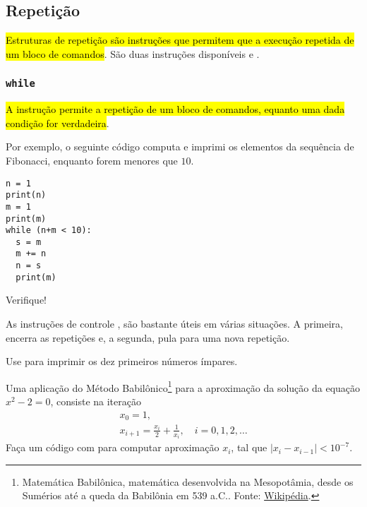 \documentclass[12pt]{article}
\begin{document}
\subsection{Repetição}

\hl{Estruturas de repetição são instruções que permitem que a execução repetida de um bloco de comandos}. São duas instruções disponíveis {\PYTHONwhile} e {\PYTHONfor}.

\subsubsection{\texttt{while}}

\hl{A instrução {\PYTHONwhile} permite a repetição de um bloco de comandos, equanto uma dada condição for verdadeira}. 

Por exemplo, o seguinte código computa e imprimi os elementos da sequência de Fibonacci{\fibonacci}, enquanto forem menores que $10$.

\begin{lstlisting}
n = 1
print(n)
m = 1
print(m)
while (n+m < 10):
  s = m
  m += n
  n = s
  print(m)
\end{lstlisting}

Verifique!

\begin{obs}
  As instruções de controle {\PYTHONbreak}, {\PYTHONcontinue} são bastante úteis em várias situações. A primeira, encerra as repetições e, a segunda, pula para uma nova repetição.
\end{obs}

\begin{exr}
  Use {\PYTHONwhile} para imprimir os dez primeiros números ímpares.
\end{exr}

\begin{exr}
  Uma aplicação do Método Babilônico\footnote{Matemática Babilônica, matemática desenvolvida na Mesopotâmia, desde os Sumérios até a queda da Babilônia em 539 a.C.. Fonte: \href{https://pt.wikipedia.org/wiki/Matem\%C3\%A1tica\_babil\%C3\%B4nica}{Wikipédia}.} para a aproximação da solução da equação $x^2-2 = 0$, consiste na iteração
  \begin{gather}
    x_0 = 1,\\
    x_{i+1} = \frac{x_i}{2} + \frac{1}{x_i},\quad i=0,1,2,\ldots
  \end{gather}
  Faça um código com {\PYTHONwhile} para computar aproximação $x_{i}$, tal que $|x_{i}-x_{i-1}|<10^{-7}$.
\end{exr}
\end{document}
